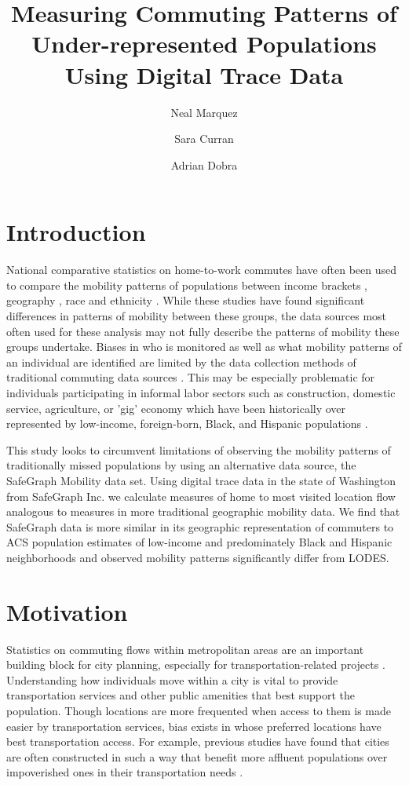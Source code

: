 \documentclass[fleqn,10pt]{olplainarticle}
\title{Measuring Commuting Patterns of Under-represented Populations Using Digital Trace Data}
\author[1]{Neal Marquez}
\author[1]{Sara Curran}
\author[2]{Adrian Dobra}
\affil[1]{University of Washington, Department of Sociology}
\affil[2]{University of Washington, Department of Statistics}
\begin{document}
\flushbottom
\maketitle
\thispagestyle{empty}

\section*{Introduction}

National comparative statistics on home-to-work commutes have often been used to compare the mobility patterns of populations between income brackets \citep{}, geography \citep{}, race and ethnicity \citep{}. While these studies have found significant differences in patterns of mobility between these groups, the data sources most often used for these analysis may not fully describe the patterns of mobility these groups undertake. Biases in who is monitored as well as what mobility patterns of an individual are identified are limited by the data collection methods of traditional commuting data sources \citep{}. This may be especially problematic for individuals participating in informal labor sectors such as construction, domestic service, agriculture, or 'gig' economy which have been historically over represented by low-income, foreign-born, Black, and Hispanic populations \citep{}.

This study looks to circumvent limitations of observing the mobility patterns of traditionally missed populations by using an alternative data source, the SafeGraph Mobility data set. Using digital trace data in the state of Washington from SafeGraph Inc. we calculate measures of home to most visited location flow analogous to measures in more traditional geographic mobility data. We find that SafeGraph data is more similar in its geographic representation of commuters to ACS population estimates of low-income and predominately Black and Hispanic neighborhoods and observed mobility patterns significantly differ from LODES.

\section*{Motivation}

Statistics on commuting flows within metropolitan areas are an important building block for city planning, especially for transportation-related projects \citep{McKenzie2013}. Understanding how individuals move within a city is vital to provide transportation services and other public amenities that best support the population. Though locations are more frequented when access to them is made easier by transportation services, bias exists in whose preferred locations have best transportation access. For example, previous studies have found that cities are often constructed in such a way that benefit more affluent populations over impoverished ones in their transportation needs \citep{soja_seeking_2010, Williams2014}.
\end{document}
